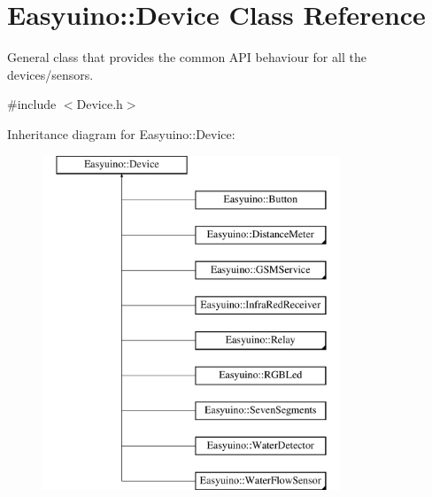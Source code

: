 \hypertarget{class_easyuino_1_1_device}{}\section{Easyuino\+:\+:Device Class Reference}
\label{class_easyuino_1_1_device}


General class that provides the common A\+PI behaviour for all the devices/sensors.  




{\ttfamily \#include $<$Device.\+h$>$}

Inheritance diagram for Easyuino\+:\+:Device\+:\begin{figure}[H]
\begin{center}
\leavevmode
\includegraphics[height=10.000000cm]{class_easyuino_1_1_device}
\end{center}
\end{figure}
